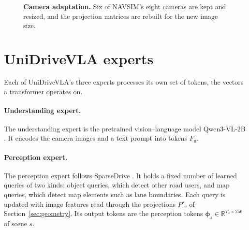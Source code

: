 \documentclass[11pt, a4paper, oneside]{book}
\begin{document}
\begin{figure}[t]
\centering
{}
\caption[Camera adaptation]{\textbf{Camera adaptation.} Six of NAVSIM's eight cameras are kept and
resized, and the projection matrices are rebuilt for the new image size.}
\label{fig:inputadapt}
\end{figure}

\section{UniDriveVLA experts}
\label{sec:moe}
Each of UniDriveVLA's three experts \cite{unidrivevla} processes its own set of tokens, the
vectors a transformer operates on.

\paragraph{Understanding expert.} The understanding expert is the pretrained vision--language
model Qwen3-VL-2B \cite{qwen3vl}. It encodes the camera images and a text prompt into tokens
$F_\mathrm{u}$.

\paragraph{Perception expert.} The perception expert follows SparseDrive \cite{sparsedrive}.
It holds a fixed number of learned queries of two kinds: object queries, which detect other
road users, and map queries, which detect map elements such as lane boundaries. Each query is
updated with image features read through the projections $P'_v$ of
Section~\ref{sec:geometry}. Its output tokens are the perception tokens
$\boldsymbol{\phi}_s\in\mathbb{R}^{T_s\times256}$ of scene $s$.
\end{document}
